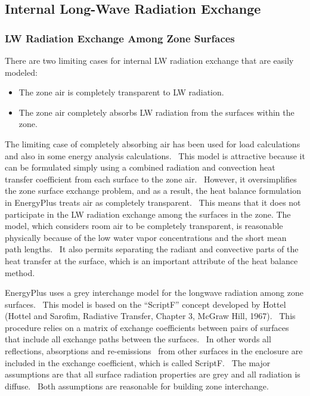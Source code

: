\subsection{Internal Long-Wave Radiation Exchange}\label{internal-long-wave-radiation-exchange}

\subsubsection{LW Radiation Exchange Among Zone Surfaces}\label{lw-radiation-exchange-among-zone-surfaces}

There are two limiting cases for internal LW radiation exchange that are easily modeled:

\begin{itemize}
\item
The zone air is completely transparent to LW radiation.
\item
The zone air completely absorbs LW radiation from the surfaces within the zone.
\end{itemize}

The limiting case of completely absorbing air has been used for load calculations and also in some energy analysis calculations.~ This model is attractive because it can be formulated simply using a combined radiation and convection heat transfer coefficient from each surface to the zone air.~ However, it oversimplifies the zone surface exchange problem, and as a result, the heat balance formulation in EnergyPlus treats air as completely transparent.~ This means that it does not participate in the LW radiation exchange among the surfaces in the zone. The model, which considers room air to be completely transparent, is reasonable physically because of the low water vapor concentrations and the short mean path lengths.~ It also permits separating the radiant and convective parts of the heat transfer at the surface, which is an important attribute of the heat balance method.

EnergyPlus uses a grey interchange model for the longwave radiation among zone surfaces.~ This model is based on the ``ScriptF'' concept developed by Hottel (Hottel and Sarofim, Radiative Transfer, Chapter 3, McGraw Hill, 1967).~ This procedure relies on a matrix of exchange coefficients between pairs of surfaces that include all exchange paths between the surfaces.~ In other words all reflections, absorptions and re-emissions~ from other surfaces in the enclosure are included in the exchange coefficient, which is called ScriptF.~ The major assumptions are that all surface radiation properties are grey and all radiation is diffuse.~ Both assumptions are reasonable for building zone interchange.

